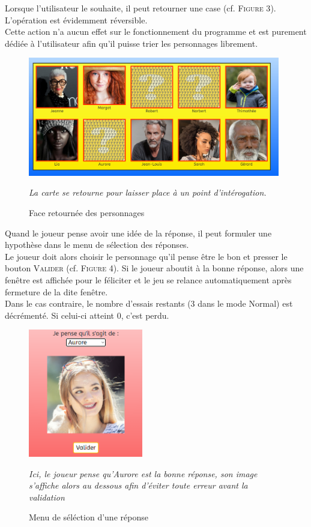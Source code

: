\documentclass{article}
\begin{document}
  	            	Lorsque l'utilisateur le souhaite, il peut retourner une case (cf. \textsc{Figure 3}). L'opération est évidemment réversible.\\
  		            Cette action n'a aucun effet sur le fonctionnement du programme et est purement dédiée à l'utilisateur afin qu'il puisse trier les personnages librement.\\
  		        \begin{figure}[h]
          			\includegraphics[width=11cm]{images/Retournement.PNG}
          			\centering
          			\caption{Face retournée des personnages}
          			\textit{La carte se retourne pour laisser place à un point d'intérogation.}
        		\end{figure}
        	    \par
        		Quand le joueur pense avoir une idée de la réponse, il peut formuler une hypothèse dans le menu de sélection des réponses.\\
        		Le joueur doit alors choisir le personnage qu'il pense être le bon et presser le bouton \textsc{Valider} (cf. \textsc{Figure 4}). Si le joueur aboutit à la bonne réponse, alors une fenêtre est affichée pour le féliciter et le jeu se relance automatiquement après fermeture de la dite fenêtre.\\
        		Dans le cas contraire, le nombre d'essais restants (3 dans le mode \textsf{Normal}) est décrémenté. Si celui-ci atteint 0, c'est perdu.\\
        		\begin{figure}[h]
          			\includegraphics[width=5cm]{images/Choix.PNG}
          			\centering
          			\caption{Menu de séléction d'une réponse}
          			\textit{Ici, le joueur pense qu'Aurore est la bonne réponse, son image \\s'affiche alors au dessous afin d'éviter toute erreur avant la validation}
        		\end{figure}
\end{document}
